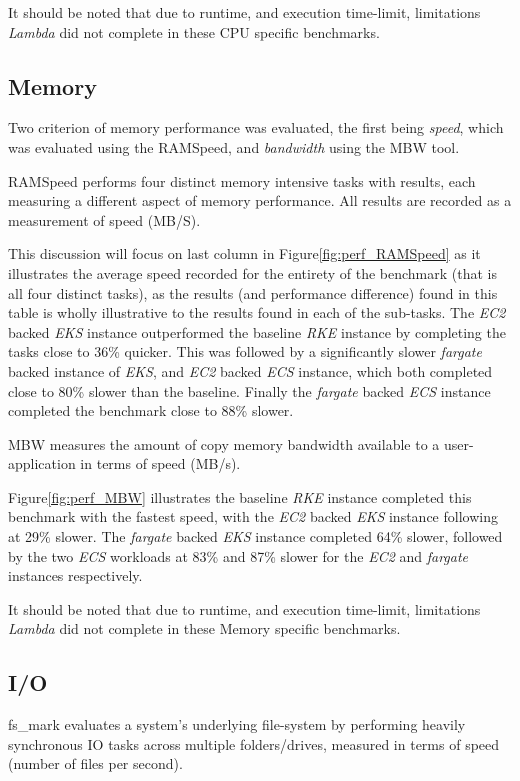\noindent \newline It should be noted that due to runtime, and execution time-limit, limitations \textit{Lambda} did not complete in these CPU specific benchmarks.

\subsection{Memory}
Two criterion of memory performance was evaluated, the first being \emph{speed},
which was evaluated using the RAMSpeed, and \emph{bandwidth} using the MBW tool.

RAMSpeed performs four distinct memory intensive tasks with results, each measuring a different aspect of memory performance.
All results are recorded as a measurement of speed (MB/S).

This discussion will focus on last column in Figure\ref{fig:perf_RAMSpeed} as it illustrates the average speed recorded for the entirety of the benchmark (that is all four distinct tasks),
as the results (and performance difference) found in this table is wholly illustrative to the results found in each of the sub-tasks.
The \textit{EC2} backed \textit{EKS} instance outperformed the baseline \textit{RKE} instance by completing the tasks close to 36\% quicker.
This was followed by a significantly slower \textit{fargate} backed instance of \textit{EKS}, and \textit{EC2} backed \textit{ECS} instance,
which both completed close to 80\% slower than the baseline.
Finally the \textit{fargate} backed \textit{ECS} instance completed the benchmark close to 88\% slower.

\noindent \newline MBW measures the amount of copy memory bandwidth available to a user-application in terms of speed (MB/s).

Figure\ref{fig:perf_MBW} illustrates the baseline \textit{RKE} instance completed this benchmark with the fastest speed, with the \textit{EC2} backed \textit{EKS} instance following at 29\% slower.
The \textit{fargate} backed \textit{EKS} instance completed 64\% slower,
followed by the two \textit{ECS} workloads at 83\% and 87\% slower for the \textit{EC2} and \textit{fargate} instances respectively.

\noindent \newline It should be noted that due to runtime, and execution time-limit, limitations \textit{Lambda} did not complete in these Memory specific benchmarks.

\subsection{I/O}
fs\_mark evaluates a system's underlying file-system by performing heavily synchronous IO tasks across multiple folders/drives, measured in terms of speed (number of files per second).

